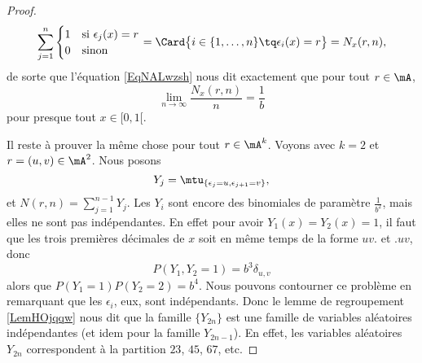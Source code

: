 \begin{proof}
    \begin{equation}
        \sum_{j=1}^n\begin{cases}
            1    &   \text{si } \epsilon_j(x)=r\\
            0    &    \text{sinon}
        \end{cases}
        =
        \Card\big\{  i\in\{ 1,\ldots, n \}\tq \epsilon_i(x)=r \big\}=N_x(r,n),
    \end{equation}
    de sorte que l'équation \eqref{EqNALwzsh} nous dit exactement que pour tout \( r\in \mA\),
    \begin{equation}
        \lim_{n\to \infty} \frac{ N_x(r,n) }{ n }=\frac{1}{ b }
    \end{equation}
    pour presque tout \( x\in\mathopen[ 0 , 1 [\).

    Il reste à prouver la même chose pour tout \( r\in\mA^k\). Voyons avec \( k=2\) et \( r=(u,v)\in\mA^2\). Nous posons
    \begin{equation}
        Y_j=\mtu_{\{ \epsilon_j=u,\epsilon_{j+1}=v \}},
    \end{equation}
    et \( N(r,n)=\sum_{j=1}^{n-1}Y_j\). Les \( Y_i\) sont encore des binomiales de paramètre \( \frac{1}{ b^2 }\), mais elles ne sont pas indépendantes. En effet pour avoir \( Y_1(x)=Y_2(x)=1\), il faut que les trois premières décimales de \( x\) soit en même temps de la forme \( uv.\) et \( .uv\), donc
    \begin{equation}
        P(Y_1,Y_2=1)=b^3\delta_{u,v}
    \end{equation}
    alors que \( P(Y_1=1)P(Y_2=2)=b^4\). Nous pouvons contourner ce problème en remarquant que les \( \epsilon_i\), eux, sont indépendants. Donc le lemme de regroupement \ref{LemHOjqqw} nous dit que la famille \( \{ Y_{2n} \} \) est une famille de variables aléatoires indépendantes (et idem pour la famille \( Y_{2n-1}\)). En effet, les variables aléatoires \( Y_{2n}\) correspondent à la partition \( 23\), \( 45\), \( 67\), etc.


\end{proof}
